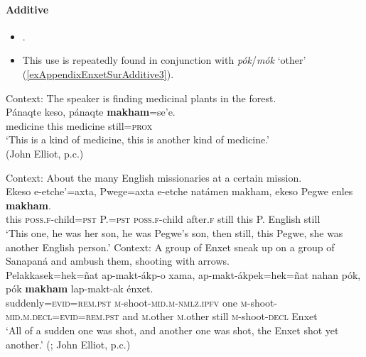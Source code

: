 \paragraph{Additive}\label{appendixEnxetSurAdditive}
\begin{itemize}
	\item \textcite[570]{Elliot2021}.
	\item This use is repeatedly found in conjunction with \textit{pók}/\textit{mók} \lq other\rq{ }(\ref{exAppendixEnxetSurAdditive3}).
\end{itemize}
\begin{exe}
	\ex Context: The speaker is finding medicinal plants in the forest.\\
	\gll Pánaqte keso, pánaqte \textbf{makham}=se'e.\\
	medicine this medicine still=\textsc{prox}\\
	\glt \lq This is a kind of medicine, this is another kind of medicine.' 
	\\(John Elliot, p.c.)
	
	\ex	Context: About the many English missionaries at a certain mission.\\
	\gll Ekeso e-etche'=axta, Pwege=axta e-etche natámen makham, ekeso Pegwe enles \textbf{makham}.\\
	this \textsc{poss}.\textsc{f}-child=\textsc{pst} P.=\textsc{pst}  \textsc{poss}.\textsc{f}-child after.\textsc{f} still this P. English still\\
	\glt \lq This one, he was her son, he was Pegwe's son, then still, this Pegwe, she was another English person.' \parencite[267–268]{Elliot2021}
	\pagebreak
	\ex\label{exAppendixEnxetSurAdditive3}
	Context: A group of Enxet sneak up on a group of Sanapaná and ambush them, shooting with arrows.\\
	\gll Pelakkasek=hek=ñat ap-makt-ákp-o xama, ap-makt-ákpek=hek=ñat nahan pók, pók \textbf{makham} lap-makt-ak énxet.\\
	suddenly=\textsc{evid}=\textsc{rem}.\textsc{pst} \textsc{m}-shoot-\textsc{mid}.\textsc{m}-\textsc{nmlz}.\textsc{ipfv} one \textsc{m}-shoot-\textsc{mid}.\textsc{m}.\textsc{decl}=\textsc{evid}=\textsc{rem}.\textsc{pst} and \textsc{m}.other \textsc{m}.other still \textsc{m}-shoot-\textsc{decl} Enxet\\
	\glt \lq All of a sudden one was shot, and another one was shot, the Enxet shot yet another.' (\cite{LopezRamirez1996}; John Elliot, p.c.)
	\end{exe}


